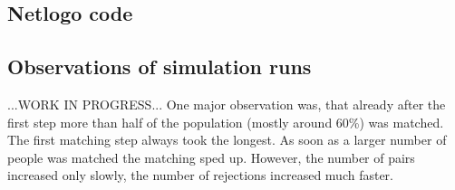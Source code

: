 \subsection{Netlogo code}


\subsection{Observations of simulation runs}
...WORK IN PROGRESS...
One major observation was, that already after the first step more than half of the population (mostly around 60\%) was matched.
The first matching step always took the longest.
As soon as a larger number of people was matched the matching sped up.
However, the number of pairs increased only slowly, the number of rejections increased much faster.
